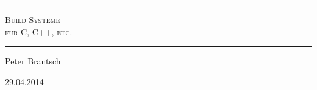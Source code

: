 \begin{titlepage}
	\begin{minipage}[t]{0.85\textwidth}
		\hrule
		\vspace{1em}
		\center
		{ \Huge\textsc{
			Build-Systeme
		}}\\[0.5em]
		{ \large\textsc{
			für C, C++, etc.
		}}
		\vspace{1em}
		\hrule
		\vspace{2em}
		Peter Brantsch

		29.04.2014
	\end{minipage}
\end{titlepage}
